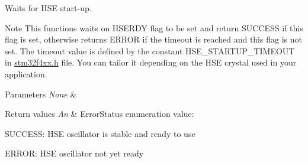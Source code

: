 Waits for H\+SE start-\/up. 

\begin{DoxyNote}{Note}
This functions waits on H\+S\+E\+R\+DY flag to be set and return S\+U\+C\+C\+E\+SS if this flag is set, otherwise returns E\+R\+R\+OR if the timeout is reached and this flag is not set. The timeout value is defined by the constant H\+S\+E\+\_\+\+S\+T\+A\+R\+T\+U\+P\+\_\+\+T\+I\+M\+E\+O\+UT in \hyperlink{stm32f4xx_8h}{stm32f4xx.\+h} file. You can tailor it depending on the H\+SE crystal used in your application. 
\end{DoxyNote}

\begin{DoxyParams}{Parameters}
{\em None} & \\
\hline
\end{DoxyParams}

\begin{DoxyRetVals}{Return values}
{\em An} & Error\+Status enumeration value\+:
\begin{DoxyItemize}
\item S\+U\+C\+C\+E\+SS\+: H\+SE oscillator is stable and ready to use
\item E\+R\+R\+OR\+: H\+SE oscillator not yet ready 
\end{DoxyItemize}\\
\hline
\end{DoxyRetVals}
